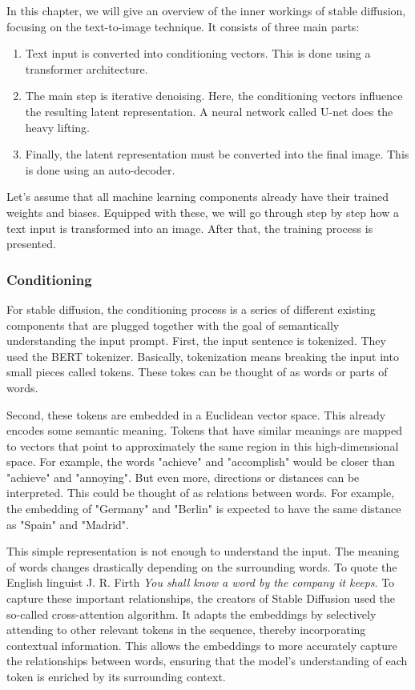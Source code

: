 \documentclass[11pt]{article}
\begin{document}
In this chapter, we will give an overview of the inner workings of stable diffusion, focusing on the text-to-image technique. It consists of three main parts:
\begin{enumerate}
    \item Text input is converted into conditioning vectors. This is done using a transformer architecture.
    \item The main step is iterative denoising. Here, the conditioning vectors influence the resulting latent representation. A neural network called U-net does the heavy lifting.
    \item Finally, the latent representation must be converted into the final image. This is done using an auto-decoder.
\end{enumerate}

Let's assume that all machine learning components already have their trained weights and biases. Equipped with these, we will go through step by step how a text input is transformed into an image. After that, the training process is presented.

\subsubsection{Conditioning}
For stable diffusion, the conditioning process is a series of different existing components that are plugged together with the goal of semantically understanding the input prompt. First, the input sentence is tokenized. They used the BERT tokenizer\cite{devlin2019bert}. Basically, tokenization means breaking the input into small pieces called tokens. These tokes can be thought of as words or parts of words.

Second, these tokens are embedded in a Euclidean vector space. This already encodes some semantic meaning. Tokens that have similar meanings are mapped to vectors that point to approximately the same region in this high-dimensional space. For example, the words "achieve" and "accomplish" would be closer than "achieve" and "annoying". But even more, directions or distances can be interpreted. This could be thought of as relations between words. For example, the embedding of "Germany" and "Berlin" is expected to have the same distance as "Spain" and "Madrid".

This simple representation is not enough to understand the input. The meaning of words changes drastically depending on the surrounding words. To quote the English linguist J. R. Firth \textit{You shall know a word by the company it keeps}\cite{firth1962studiesinlinguisticanalysis}. To capture these important relationships, the creators of Stable Diffusion used the so-called cross-attention algorithm\cite{vaswani2023attentionneed}. It adapts the embeddings by selectively attending to other relevant tokens in the sequence, thereby incorporating contextual information. This allows the embeddings to more accurately capture the relationships between words, ensuring that the model's understanding of each token is enriched by its surrounding context.
\end{document}
